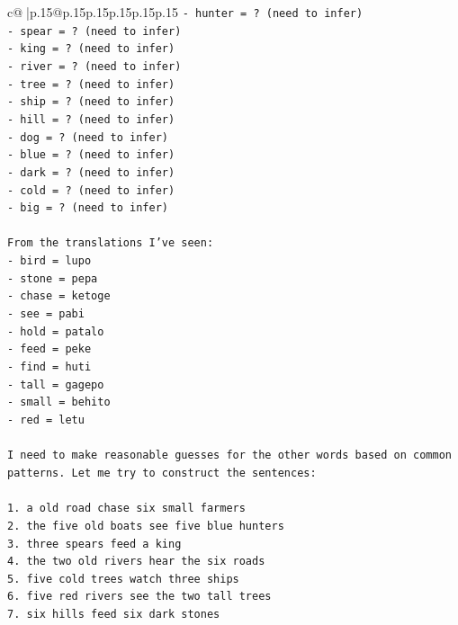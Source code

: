 \documentclass{article}
\begin{document}
{\begin{supertabular}{c@{$\;$}|p{.15\linewidth}@{}p{.15\linewidth}p{.15\linewidth}p{.15\linewidth}p{.15\linewidth}p{.15\linewidth}}
{{{\texttt{{-} hunter = ? (need to infer)} \\
\texttt{{-} spear = ? (need to infer)} \\
\texttt{{-} king = ? (need to infer)} \\
\texttt{{-} river = ? (need to infer)} \\
\texttt{{-} tree = ? (need to infer)} \\
\texttt{{-} ship = ? (need to infer)} \\
\texttt{{-} hill = ? (need to infer)} \\
\texttt{{-} dog = ? (need to infer)} \\
\texttt{{-} blue = ? (need to infer)} \\
\texttt{{-} dark = ? (need to infer)} \\
\texttt{{-} cold = ? (need to infer)} \\
\texttt{{-} big = ? (need to infer)} \\
\\ 
\texttt{From the translations I've seen:} \\
\texttt{{-} bird = lupo} \\
\texttt{{-} stone = pepa} \\
\texttt{{-} chase = ketoge} \\
\texttt{{-} see = pabi} \\
\texttt{{-} hold = patalo} \\
\texttt{{-} feed = peke} \\
\texttt{{-} find = huti} \\
\texttt{{-} tall = gagepo} \\
\texttt{{-} small = behito} \\
\texttt{{-} red = letu} \\
\\ 
\texttt{I need to make reasonable guesses for the other words based on common patterns. Let me try to construct the sentences:} \\
\\ 
\texttt{1. a old road chase six small farmers} \\
\texttt{2. the five old boats see five blue hunters} \\
\texttt{3. three spears feed a king} \\
\texttt{4. the two old rivers hear the six roads} \\
\texttt{5. five cold trees watch three ships} \\
\texttt{6. five red rivers see the two tall trees} \\
\texttt{7. six hills feed six dark stones} \\
}}}
\end{supertabular}}
\end{document}
